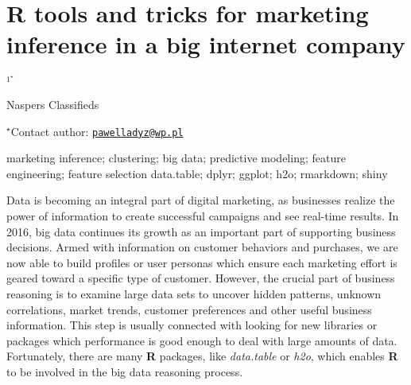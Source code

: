\documentclass[\main/boa.tex]{subfiles}
\begin{document}
\section{R tools and tricks for marketing inference in a big internet company}

\begin{center}
  {\bf {}$^{1^\star}$}
\end{center}

\vskip 0.3cm

\begin{affiliations}
\begin{enumerate}
\begin{minipage}{0.915\textwidth}
\centering
\item Naspers Classifieds \\[-2pt]
\end{minipage}
\end{enumerate}
$^\star$Contact author: \href{mailto:pawelladyz@wp.pl}{\nolinkurl{pawelladyz@wp.pl}}\\
\end{affiliations}

\vskip 0.5cm

\begin{minipage}{0.915\textwidth}
\keywords marketing inference; clustering; big data; predictive modeling; feature
engineering; feature selection
\packages data.table; dplyr; ggplot; h2o; rmarkdown; shiny
\end{minipage}

\vskip 0.8cm

Data is becoming an integral part of digital marketing, as businesses
realize the power of information to create successful campaigns and see
real-time results. In 2016, big data continues its growth as an
important part of supporting business decisions. Armed with information
on customer behaviors and purchases, we are now able to build profiles
or user personas which ensure each marketing effort is geared toward a
specific type of customer. However, the crucial part of business
reasoning is to examine large data sets to uncover hidden patterns,
unknown correlations, market trends, customer preferences and other
useful business information. This step is usually connected with looking
for new libraries or packages which performance is good enough to deal
with large amounts of data. Fortunately, there are many \textbf{R}
packages, like \emph{data.table} or \emph{h2o}, which enables \textbf{R}
to be involved in the big data reasoning process.
\end{document}
